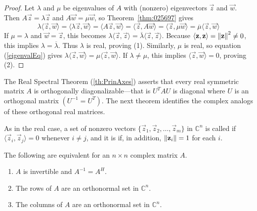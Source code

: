 \documentclass{ximera}
\begin{document}
\begin{proof}
Let $\lambda$ and $\mu$ be eigenvalues of $A$ with (nonzero) eigenvectors $\vec{z}$ and $\vec{w}$. Then $A\vec{z} = \lambda \vec{z}$ and $A\vec{w} = \mu \vec{w}$, so Theorem~\ref{thm:025697} gives
\begin{equation} \label{eigenvalEq}
\lambda \langle \vec{z}, \vec{w} \rangle = \langle \lambda \vec{z}, \vec{w} \rangle = \langle A\vec{z}, \vec{w} \rangle = \langle \vec{z}, A\vec{w} \rangle = \langle \vec{z}, \mu \vec{w} \rangle = \overline{\mu} \langle \vec{z}, \vec{w} \rangle
\end{equation}
If $\mu = \lambda$ and $\vec{w} = \vec{z}$, this becomes $\lambda \langle \vec{z}, \vec{z} \rangle  = \overline{\lambda} \langle \vec{z}, \vec{z} \rangle$. Because $\langle \mathbf{z}, \mathbf{z} \rangle = \left\lVert\mathbf{z}\right\rVert^{2} \neq 0$, this implies $\lambda = \overline{\lambda}$. Thus $\lambda$ is real, proving (1). Similarly, $\mu$ is real, so equation (\ref{eigenvalEq}) gives $\lambda \langle \vec{z}, \vec{w} \rangle = \mu \langle \vec{z}, \vec{w} \rangle$. If $\lambda \neq \mu$, this implies $\langle \vec{z}, \vec{w} \rangle = 0$, proving (2).
\end{proof}

The Real Spectral Theorem (\ref{th:PrinAxes}) asserts that every real symmetric matrix $A$ is orthogonally diagonalizable---that is $U^{T}AU$ is diagonal where $U$ is an orthogonal matrix $(U^{-1} = U^{T})$. The next theorem identifies the complex analogs of these orthogonal real matrices.

\begin{definition}\label{def:025749}
As in the real case, a set of nonzero vectors $\{\vec{z}_{1}, \vec{z}_{2}, \ldots, \vec{z}_{m}\}$ in $\mathbb{C}^n$ is called  if $\langle \vec{z}_{i}, \vec{z}_{j}\rangle = 0$ whenever $i \neq j$, and it is  if, in addition, $\left\lVert\mathbf{z}_{i} \right\rVert = 1$ for each $i$.
\end{definition}

\begin{theorem}\label{th:025759}
The following are equivalent for an $n \times n$ complex matrix $A$.

\begin{enumerate}
\item\label{th:025759a} $A$ is invertible and $A^{-1} = A^{H}$.

\item\label{th:025759b} The rows of $A$ are an orthonormal set in $\mathbb{C}^n$.

\item\label{th:025759c} The columns of $A$ are an orthonormal set in $\mathbb{C}^n$.

\end{enumerate}
\end{theorem}
\end{document}
